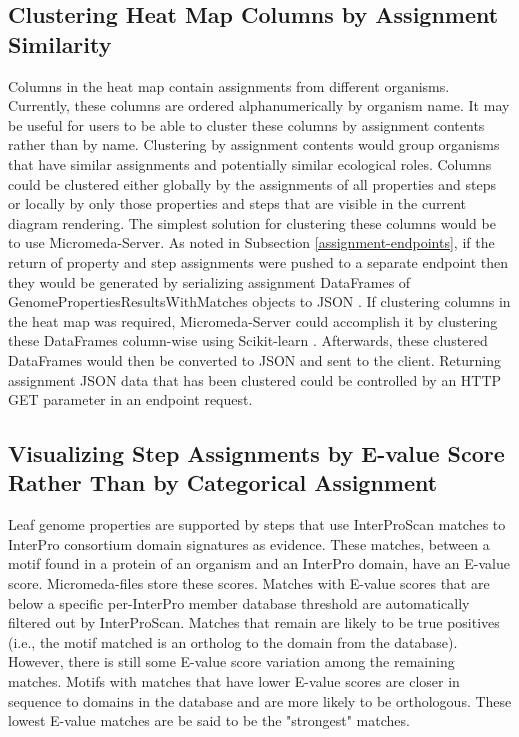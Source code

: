 \subsection{Clustering Heat Map Columns by Assignment Similarity}

Columns in the heat map contain assignments from different organisms. Currently, these columns are ordered alphanumerically by organism name. It may be useful for users to be able to cluster these columns by assignment contents rather than by name. Clustering by assignment contents would group organisms that have similar assignments and potentially similar ecological roles. Columns could be clustered either globally by the assignments of all properties and steps or locally by only those properties and steps that are visible in the current diagram rendering. The simplest solution for clustering these columns would be to use Micromeda-Server. As noted in Subsection \ref{assignment-endpoints}, if the return of property and step assignments were pushed to a separate endpoint then they would be generated by serializing assignment DataFrames of GenomePropertiesResultsWithMatches objects to JSON \cite{bray2014rfc}. If clustering columns in the heat map was required, Micromeda-Server could accomplish it by clustering these DataFrames column-wise using Scikit-learn \cite{pedregosa2011scikit}. Afterwards, these clustered DataFrames would then be converted to JSON and sent to the client. Returning assignment JSON data that has been clustered could be controlled by an HTTP GET parameter in an endpoint request.

\subsection{Visualizing Step Assignments by E-value Score Rather Than by Categorical Assignment} \label{interface-e-value}

Leaf genome properties are supported by steps that use InterProScan matches to InterPro consortium domain signatures as evidence. These matches, between a motif found in a protein of an organism and an InterPro domain, have an E-value score. Micromeda-files store these scores. Matches with E-value scores that are below a specific per-InterPro member database threshold are automatically filtered out by InterProScan. Matches that remain are likely to be true positives (i.e., the motif matched is an ortholog to the domain from the database). However, there is still some E-value score variation among the remaining matches. Motifs with matches that have lower E-value scores are closer in sequence to domains in the database and are more likely to be orthologous. These lowest E-value matches are be said to be the "strongest" matches.

